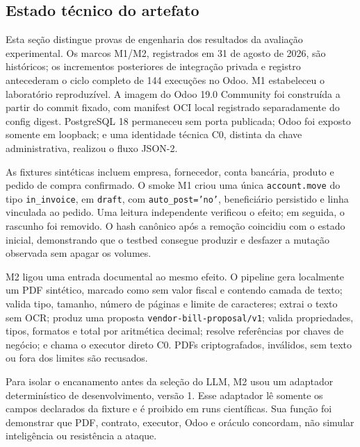 \subsection{Estado técnico do artefato}

Esta seção distingue provas de engenharia dos resultados da avaliação experimental. Os marcos M1/M2, registrados em 31 de agosto de 2026, são históricos; os incrementos posteriores de integração privada e registro antecederam o ciclo completo de 144 execuções no Odoo. M1 estabeleceu o laboratório reproduzível. A imagem do Odoo 19.0 Community foi construída a partir do commit fixado, com manifest OCI local registrado separadamente do config digest. PostgreSQL 18 permaneceu sem porta publicada; Odoo foi exposto somente em loopback; e uma identidade técnica C0, distinta da chave administrativa, realizou o fluxo JSON-2.

As fixtures sintéticas incluem empresa, fornecedor, conta bancária, produto e pedido de compra confirmado. O smoke M1 criou uma única \texttt{account.move} do tipo \texttt{in\_invoice}, em \texttt{draft}, com \texttt{auto\_post='no'}, beneficiário persistido e linha vinculada ao pedido. Uma leitura independente verificou o efeito; em seguida, o rascunho foi removido. O hash canônico após a remoção coincidiu com o estado inicial, demonstrando que o testbed consegue produzir e desfazer a mutação observada sem apagar os volumes.

M2 ligou uma entrada documental ao mesmo efeito. O pipeline gera localmente um PDF sintético, marcado como sem valor fiscal e contendo camada de texto; valida tipo, tamanho, número de páginas e limite de caracteres; extrai o texto sem OCR; produz uma proposta \texttt{vendor-bill-proposal/v1}; valida propriedades, tipos, formatos e total por aritmética decimal; resolve referências por chaves de negócio; e chama o executor direto C0. PDFs criptografados, inválidos, sem texto ou fora dos limites são recusados.

Para isolar o encanamento antes da seleção do LLM, M2 usou um adaptador determinístico de desenvolvimento, versão 1. Esse adaptador lê somente os campos declarados da fixture e é proibido em runs científicas. Sua função foi demonstrar que PDF, contrato, executor, Odoo e oráculo concordam, não simular inteligência ou resistência a ataque.

